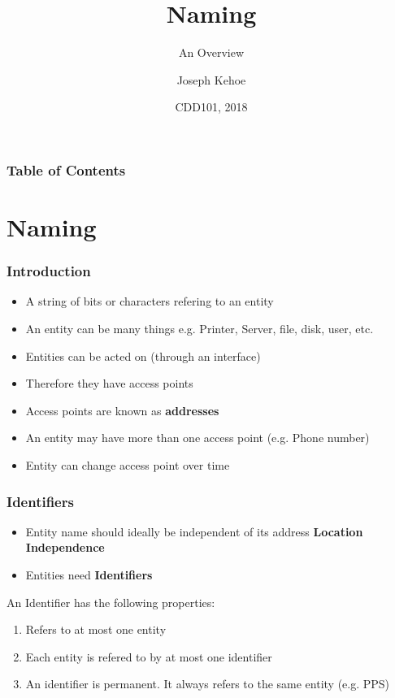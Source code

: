 \documentclass{beamer}
\title[Distributed Systems] %
{Naming}
\subtitle{An Overview}
\author[Dr. Joseph Kehoe] %
{Joseph Kehoe\inst{1}}
\institute[IT Carlow] %
{
	\inst{1}%
	Department of Computing and Networking\\
	Institute of Technology Carlow
}
\date[ITC 2018] %
{CDD101, 2018}
\begin{document}
 
\frame{\titlepage}
 
  \begin{frame}
  	\frametitle{Table of Contents}
  	\tableofcontents
  \end{frame}
 

\section{Naming}
  \begin{frame}
  	\frametitle{Introduction}

  	\begin{itemize}
  		\item A string of bits or characters refering to an entity
  		\item An entity can be many things e.g. Printer, Server, file, disk, user, etc.
  		\item Entities can be acted on (through an interface)
  		\item Therefore they have access points
  		\item Access points are known as \textbf{addresses} 
  		\item An entity may have more than one access point (e.g. Phone number)
  		\item Entity can change access point over time 
  	\end{itemize}

  	
  \end{frame}
  
    \begin{frame}
    	\frametitle{Identifiers}
    	
    	\begin{itemize}
    		\item Entity name should ideally be independent of its address \textbf{Location Independence}
    		\item Entities need \textbf{Identifiers}
    	\end{itemize}
    	An Identifier has the following properties:
    	\begin{enumerate}
    		\item Refers to at most one entity
    		\item Each entity is refered to by at most one identifier
    		\item An identifier is permanent. It always refers to the same entity (e.g. PPS)
    	\end{enumerate}
    	
    \end{frame}
 
\end{document}
